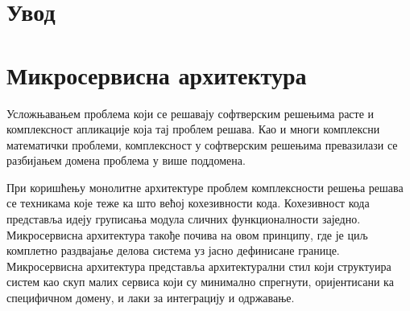 \documentclass[12pt,oneside]{memoir}
\begin{document}
\frontmatter
\naslovna
\komisija
\apstrakt
\tableofcontents*

\mainmatter

\chapter{Увод}



\chapter{Микросервисна архитектура}
\label{chp:mikroservisi}


Усложњавањем проблема који се решавају софтверским решењима расте и комплексност апликације која тај проблем решава. Као и многи комплексни математички проблеми, комплексност у софтверским решењима превазилази се разбијањем домена проблема у више поддомена. 

При коришћењу монолитне архитектуре проблем комплексности решења решава се техникама које теже ка што већој кохезивности кода. Кохезивност кода представља идеју груписања модула сличних функционалности заједно. 
Микросервисна архитектура такође почива на овом принципу, где је циљ комплетно раздвајање делова система уз јасно дефинисане границе. Микросервисна архитектура представља архитектурални стил који структуира систем као скуп малих сервиса који су минимално спрегнути, оријентисани ка специфичном домену, и лаки за интеграцију и одржавање. 
\end{document}
